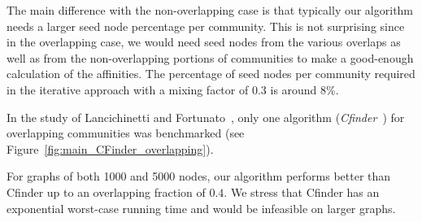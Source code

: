 The main difference with the non-overlapping case is that typically our algorithm needs a larger 
seed node percentage per community. This is not surprising since in the overlapping case, we would need seed nodes from the various overlaps as well as from the non-overlapping portions of communities to make a good-enough calculation of the affinities. The percentage of seed nodes per community required in the iterative approach with a mixing factor of $0.3$ is around 8$\%$.  

In the study of Lancichinetti and Fortunato~\cite{LF09}, 
only one algorithm (\emph{Cfinder}~\cite{PDFV05}) for overlapping communities was benchmarked 
(see Figure~\ref{fig:main_CFinder_overlapping}). 

For graphs of both 1000 and 5000 nodes, our algorithm performs better 
than Cfinder up to an overlapping fraction of $0.4$. We stress that Cfinder 
has an exponential worst-case running time and would be infeasible on larger graphs. 





